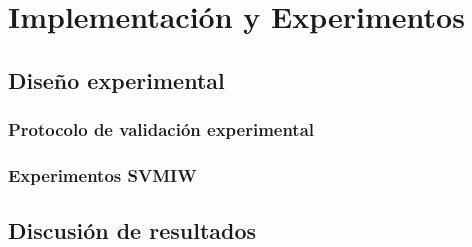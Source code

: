 \chapter{Implementación y Experimentos}
\section{Diseño experimental}
\subsection{Protocolo de validación experimental}
\subsection{Experimentos SVMIW}
\section{Discusión de resultados}
